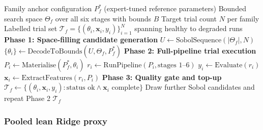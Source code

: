 \documentclass[a4paper,fleqn]{cas-dc}
\begin{document}
\begin{algorithm}[ht]
\caption{Space-filling Exploration of the Full-Pipeline Parameter Space (BO framework)}\label{alg:bo_exploration}
\begin{algorithmic}[1]
\Require Family anchor configuration $P^{*}_{f}$ (expert-tuned reference parameters)
\Require Bounded search space $\Theta_f$ over all six stages with bounds $B$
\Require Target trial count $N$ per family
\Ensure Labelled trial set $\mathcal{T}_f = \{(\theta_i, \mathbf{x}_i, y_i)\}_{i=1}^{N}$ spanning healthy to degraded runs
\State \textbf{Phase 1: Space-filling candidate generation}
\State $U \gets \text{SobolSequence}(|\Theta_f|, N)$ 
\State $\{\theta_i\} \gets \text{DecodeToBounds}(U, \Theta_f, P^{*}_{f})$ 
\State \textbf{Phase 2: Full-pipeline trial execution}
    \State $P_i \gets \text{Materialise}(P^{*}_{f}, \theta_i)$ 
    \State $r_i \gets \text{RunPipeline}(P_i, \text{stages } 1\text{--}6)$ 
    \State $y_i \gets \text{Evaluate}(r_i)$ 
    \State $\mathbf{x}_i \gets \text{ExtractFeatures}(r_i, P_i)$ 
\EndFor
\State \textbf{Phase 3: Quality gate and top-up}
\State $\mathcal{T}_f \gets \{(\theta_i, \mathbf{x}_i, y_i) : \text{status ok} \wedge \mathbf{x}_i \text{ complete}\}$
    \State Draw further Sobol candidates and repeat Phase 2 
\EndWhile
\State \Return $\mathcal{T}_f$ 
\end{algorithmic}
\end{algorithm}

\subsubsection{Pooled lean Ridge proxy}\label{sec:ridge-proxy}
\end{document}
